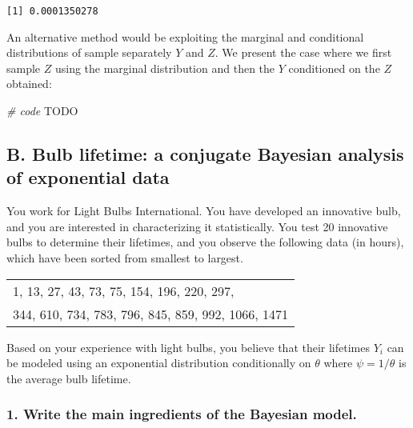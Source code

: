 \documentclass[
]{article}
\newenvironment{Shaded}{\begin{snugshade}}{\end{snugshade}}
\newcommand{\AlertTok}[1]{\textcolor[rgb]{0.94,0.16,0.16}{#1}}
\newcommand{\CommentTok}[1]{\textcolor[rgb]{0.56,0.35,0.01}{\textit{#1}}}
\begin{document}
\begin{verbatim}
[1] 0.0001350278
\end{verbatim}

An alternative method would be exploiting the marginal and conditional
distributions of sample separately \(Y\) and \(Z\). We present the case
where we first sample \(Z\) using the marginal distribution and then the
\(Y\) conditioned on the \(Z\) obtained:

\begin{Shaded}
\begin{Highlighting}[]
\CommentTok{\# code }\AlertTok{TODO}
\end{Highlighting}
\end{Shaded}

\bigskip

\newpage

\hypertarget{b.-bulb-lifetime-a-conjugate-bayesian-analysis-of-exponential-data}{%
\subsection{B. Bulb lifetime: a conjugate Bayesian analysis of
exponential
data}\label{b.-bulb-lifetime-a-conjugate-bayesian-analysis-of-exponential-data}}

You work for Light Bulbs International. You have developed an innovative
bulb, and you are interested in characterizing it statistically. You
test 20 innovative bulbs to determine their lifetimes, and you observe
the following data (in hours), which have been sorted from smallest to
largest.

\begin{table}[!h]
\centering
\begin{tabular}{l}
1, 13, 27, 43, 73, 75, 154, 196, 220, 297,\\
344, 610, 734, 783, 796, 845, 859, 992, 1066, 1471
\end{tabular}
\end{table}

Based on your experience with light bulbs, you believe that their
lifetimes \(Y_i\) can be modeled using an exponential distribution
conditionally on \(\theta\) where \(\psi = 1/\theta\) is the average
bulb lifetime.

\hypertarget{write-the-main-ingredients-of-the-bayesian-model.}{%
\subsubsection{1. Write the main ingredients of the Bayesian
model.}\label{write-the-main-ingredients-of-the-bayesian-model.}}
\end{document}

